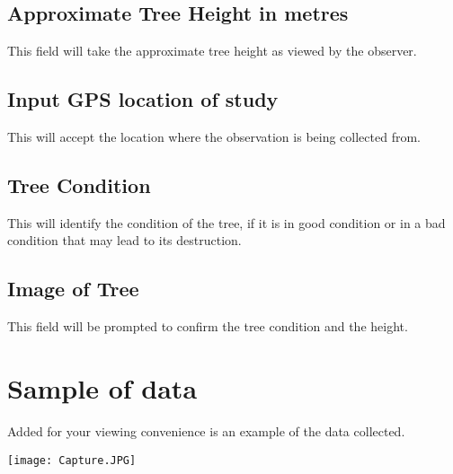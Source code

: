 \documentclass[10pt,a4paper]{article}
\begin{document}
\subsection{Approximate Tree Height in metres}
This field will take the approximate tree height as viewed by the observer.

\subsection {Input GPS location of study}
This will accept the location where the observation is being collected from.

\subsection {Tree Condition}
This will identify the condition of the tree, if it is in good condition or in a bad condition that may lead to its destruction.

\subsection {Image of Tree}
This field will be prompted to confirm the tree condition and the height.


\section{Sample of data}
Added for your viewing convenience is an example of the data collected.
\begin{flushleft}
\texttt{[image: Capture.JPG]} 
\end{flushleft}
  
\end{document}
